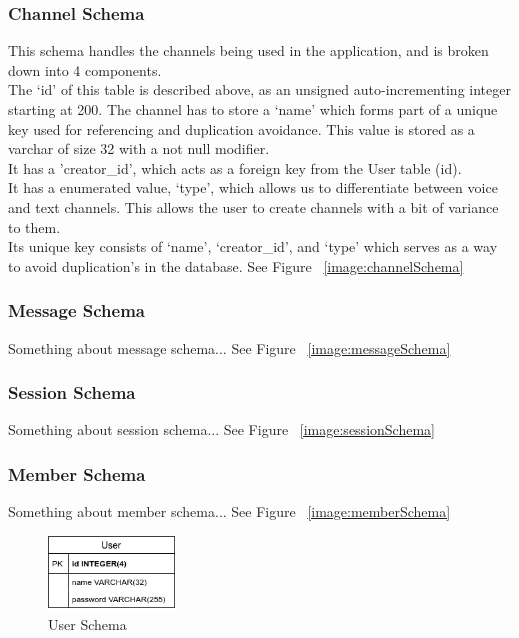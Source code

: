 \subsubsection{Channel Schema}
This schema handles the channels being used in the application, and is broken down into 4 components.
\\The ‘id’ of this table is described above, as an unsigned auto-incrementing integer starting at 200.
The channel has to store a ‘name’ which forms part of a unique key used for referencing and duplication avoidance. This value is stored as a varchar of size 32 with a not null modifier.
\\It has a 'creator\_id', which acts as a foreign key from the User table (id).
\\It has a enumerated value, ‘type’, which allows us to differentiate between voice and text channels. This allows the user to create channels with a bit of variance to them.
\\Its unique key consists of ‘name’, ‘creator\_id’, and ‘type’ which serves as a way to avoid duplication's in the database.
See Figure ~\ref{image:channelSchema}

\subsubsection{Message Schema}
Something about message schema...
See Figure ~\ref{image:messageSchema}

\subsubsection{Session Schema}
Something about session schema...
See Figure ~\ref{image:sessionSchema}

\subsubsection{Member Schema}
Something about member schema...
See Figure ~\ref{image:memberSchema}

\begin{figure}[h!]
    \caption{User Schema}
    \label{image:userSchema}
    \centering
    \includegraphics[width=0.3\textwidth]{images/UserSchema.png}
\end{figure}

